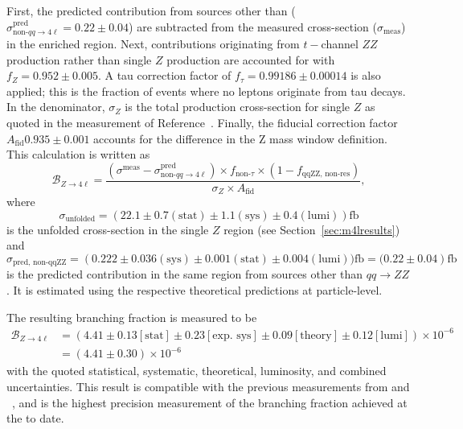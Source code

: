 First, the predicted contribution from sources other than \qqFourL{} ($\sigma_{\text{non-}qq\to 4\ell}^{\text{pred}}=0.22\pm0.04$) are subtracted from the measured cross-section ($\sigma_{\text{meas}}$) in the \ZFourL enriched region. Next, contributions originating from $t-$channel $ZZ$ production rather than single $Z$ production are accounted for with $f_{Z}=0.952\pm0.005$. A tau correction factor of $f_{\tau}=0.99186\pm0.00014$ is also applied; this is the fraction of events where no leptons originate from tau decays. In the denominator, $\sigma_Z$ is the total production cross-section for single $Z$ as quoted in the \ATLAS measurement of Reference~\cite{ATLAS_WZXS}. Finally, the fiducial correction factor $A_{\text{fid}}0.935 \pm 0.001$ accounts for the difference in the Z mass window definition. This calculation is written as
\begin{equation*}
    \mathcal{B}_{Z\rightarrow 4\ell} = \frac{\left(\sigma^{\text{meas}}-\sigma_{\text{non-}qq\to 4\ell}^{\text{pred}}\right) \times f_{\text{non-}\tau} \times (1-f_{\text{qqZZ, non-res}})}{\sigma_{Z} \times A_{\text{fid}}},
\end{equation*}
where 
\begin{equation*}
    \sigma_{\text{unfolded}} = \left(22.1 \pm 0.7(\text{stat}) \pm 1.1(\text{sys}) \pm 0.4 (\text{lumi})  \right)\text{fb} 
\end{equation*}
is the unfolded cross-section in the single $Z$ region (see Section~\ref{sec:m4lresults}) and  
\begin{equation*}
    \sigma_{\text{pred, non-qqZZ}} =  \left(0.222 \pm 0.036(\text{sys}) \pm 0.001 (\text{stat}) \pm 0.004 (\text{lumi}))\text{fb} = (0.22\pm 0.04 \right) \text{fb}
\end{equation*}
is the predicted contribution in the same region from sources other than $qq\to ZZ$. It is estimated using the respective theoretical predictions at particle-level. 

The resulting \ZFourL branching fraction is measured to be
\begin{align*}
    \mathcal{B}_{Z\rightarrow 4\ell} & = \left( 4.41 \pm 0.13 \left[\text{stat}\right] \pm 0.23 \left[\text{exp. sys}\right] \pm 0.09 \left[\text{theory}\right]\pm 0.12 \left[\text{lumi}\right] \right) \times 10^{-6} \\
    & =  \left( 4.41 \pm 0.30 \right) \times 10^{-6}
\end{align*}
with the quoted statistical, systematic, theoretical, luminosity, and combined uncertainties. This result is compatible with the previous measurements from \CMS and \ATLAS~\cite{Aaboud:2019lxo,Sirunyan:s10052-018-5567-9,Aaboud:2014zbr}, and is the highest precision measurement of the \ZFourL branching fraction achieved at the \LHC to date. 


